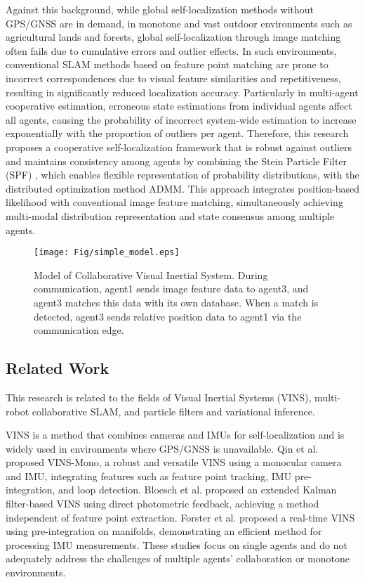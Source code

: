 \documentclass[a4paper,fleqn,10pt,twocolumn]{SICE_ISCS}
\begin{document}
Against this background, while global self-localization methods without GPS/GNSS are in demand, in monotone and vast outdoor environments such as agricultural lands and forests, global self-localization through image matching often fails due to cumulative errors and outlier effects. In such environments, conventional SLAM methods based on feature point matching are prone to incorrect correspondences due to visual feature similarities and repetitiveness, resulting in significantly reduced localization accuracy.
Particularly in multi-agent cooperative estimation, erroneous state estimations from individual agents affect all agents, causing the probability of incorrect system-wide estimation to increase exponentially with the proportion of outliers per agent.
Therefore, this research proposes a cooperative self-localization framework that is robust against outliers and maintains consistency among agents by combining the Stein Particle Filter (SPF) \cite{Liu2016}, which enables flexible representation of probability distributions, with the distributed optimization method ADMM. This approach integrates position-based likelihood with conventional image feature matching, simultaneously achieving multi-modal distribution representation and state consensus among multiple agents.
\begin{figure}[t]
	\begin{center}
		\texttt{[image: Fig/simple\_model.eps]}
		\caption{Model of Collaborative Visual Inertial System. During communication, agent1 sends image feature data to agent3, and agent3 matches this data with its own database. When a match is detected, agent3 sends relative position data to agent1 via the communication edge.}
		\label{fig:simple_model}
	\end{center}
	\vspace{-2mm}
\end{figure}

\subsection{Related Work}
This research is related to the fields of Visual Inertial Systems (VINS), multi-robot collaborative SLAM, and particle filters and variational inference.

VINS is a method that combines cameras and IMUs for self-localization and is widely used in environments where GPS/GNSS is unavailable. Qin et al. \cite{Qin2018} proposed VINS-Mono, a robust and versatile VINS using a monocular camera and IMU, integrating features such as feature point tracking, IMU pre-integration, and loop detection. Bloesch et al. \cite{Bloesch2017} proposed an extended Kalman filter-based VINS using direct photometric feedback, achieving a method independent of feature point extraction. Forster et al. \cite{Forster2017} proposed a real-time VINS using pre-integration on manifolds, demonstrating an efficient method for processing IMU measurements. These studies focus on single agents and do not adequately address the challenges of multiple agents' collaboration or monotone environments.
\end{document}
